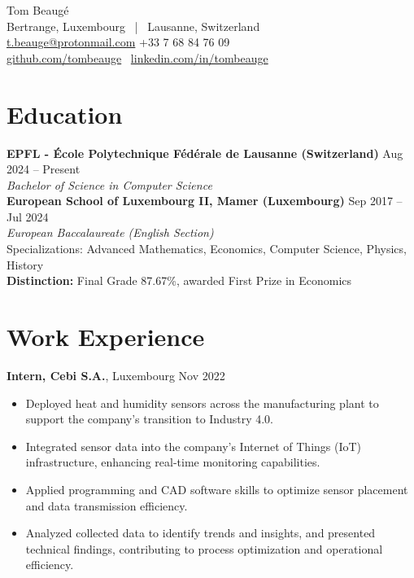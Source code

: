 \documentclass[10pt, letterpaper]{article}
\newenvironment{highlights}{
    \begin{itemize}[topsep=0.10cm, parsep=0.10cm, partopsep=0pt, itemsep=0pt, leftmargin=10pt]
}{
    \end{itemize}
}
\begin{document}
\begin{center}
    {\LARGE Tom Beaug\'e} \\[5pt]
    Bertrange, Luxembourg \ | \ Lausanne, Switzerland \\
    \href{mailto:t.beauge@protonmail.com}{t.beauge@protonmail.com} \quad
    +33 7 68 84 76 09 \\
    \href{https://github.com/tombeauge}{github.com/tombeauge} \
    \href{https://www.linkedin.com/in/tombeauge/}{linkedin.com/in/tombeauge}
\end{center}

\section{Education}
\textbf{EPFL - École Polytechnique Fédérale de Lausanne (Switzerland)} \hfill Aug 2024 -- Present \\
\textit{Bachelor of Science in Computer Science} \\[5pt]

\textbf{European School of Luxembourg II, Mamer (Luxembourg)} \hfill Sep 2017 -- Jul 2024 \\
\textit{European Baccalaureate (English Section)} \\ 
Specializations: Advanced Mathematics, Economics, Computer Science, Physics, History \\[3pt]
\textbf{Distinction:} Final Grade 87.67\%, awarded First Prize in Economics

\section{Work Experience}

\textbf{Intern, Cebi S.A.}, Luxembourg \hfill Nov 2022 \\
\begin{highlights}
    \item Deployed heat and humidity sensors across the manufacturing plant to support the company’s transition to Industry 4.0.
    \item Integrated sensor data into the company’s Internet of Things (IoT) infrastructure, enhancing real-time monitoring capabilities.
    \item Applied programming and CAD software skills to optimize sensor placement and data transmission efficiency.
    \item Analyzed collected data to identify trends and insights, and presented technical findings, contributing to process optimization and operational efficiency.
\end{highlights}
\end{document}
